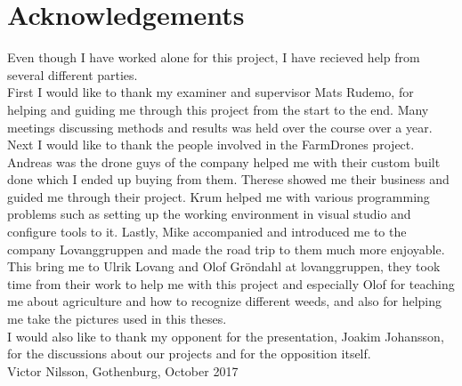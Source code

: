 \thispagestyle{plain}			%
\section*{Acknowledgements}

Even though I have worked alone for this project, I have recieved help from several different parties.\\

First I would like to thank my examiner and supervisor Mats Rudemo, for helping and guiding me through this project from the start to the end. Many meetings discussing methods and results was held over the course over a year.\\

Next I would like to thank the people involved in the FarmDrones project. Andreas was the drone guys of the company helped me with their custom built done which I ended up buying from them. Therese showed me their business and guided me through their project. Krum helped me with various programming problems such as setting up the working environment in visual studio and configure tools to it. Lastly, Mike accompanied and introduced me to the company Lovanggruppen and made the road trip to them much more enjoyable.\\

This bring me to Ulrik Lovang and Olof Gröndahl at lovanggruppen, they took time from their work to help me with this project and especially Olof for teaching me about agriculture and how to recognize different weeds, and also for helping me take the pictures used in this theses.\\

I would also like to thank my opponent for the presentation, Joakim Johansson, for the discussions about our projects and for the opposition itself.\\

\vspace{1.5cm}
\hfill
Victor Nilsson, Gothenburg, October 2017

\newpage				%
\thispagestyle{empty}
\mbox{}
